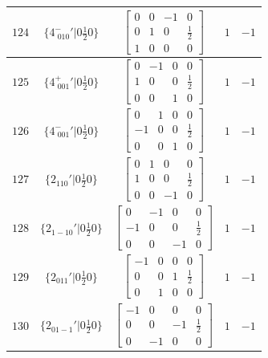 \documentclass[fleqn,8pt]{jsarticle}
\begin{document}
\begin{longtable}{ccccc}
$ 124 $ & $ \{4^{-}_{\,\,010}{}'|0 \frac{1}{2} 0\} $ & $ \begin{bmatrix} 0 & 0 & -1 & 0 \\ 0 & 1 & 0 & \frac{1}{2} \\ 1 & 0 & 0 & 0 \end{bmatrix} $ & $ 1 $ & $ -1 $ \\ \hline
$ 125 $ & $ \{4^{+}_{\,\,001}{}'|0 \frac{1}{2} 0\} $ & $ \begin{bmatrix} 0 & -1 & 0 & 0 \\ 1 & 0 & 0 & \frac{1}{2} \\ 0 & 0 & 1 & 0 \end{bmatrix} $ & $ 1 $ & $ -1 $ \\ \hline
$ 126 $ & $ \{4^{-}_{\,\,001}{}'|0 \frac{1}{2} 0\} $ & $ \begin{bmatrix} 0 & 1 & 0 & 0 \\ -1 & 0 & 0 & \frac{1}{2} \\ 0 & 0 & 1 & 0 \end{bmatrix} $ & $ 1 $ & $ -1 $ \\ \hline
$ 127 $ & $ \{2{}_{110}{}'|0 \frac{1}{2} 0\} $ & $ \begin{bmatrix} 0 & 1 & 0 & 0 \\ 1 & 0 & 0 & \frac{1}{2} \\ 0 & 0 & -1 & 0 \end{bmatrix} $ & $ 1 $ & $ -1 $ \\ \hline
$ 128 $ & $ \{2{}_{1-10}{}'|0 \frac{1}{2} 0\} $ & $ \begin{bmatrix} 0 & -1 & 0 & 0 \\ -1 & 0 & 0 & \frac{1}{2} \\ 0 & 0 & -1 & 0 \end{bmatrix} $ & $ 1 $ & $ -1 $ \\ \hline
$ 129 $ & $ \{2{}_{011}{}'|0 \frac{1}{2} 0\} $ & $ \begin{bmatrix} -1 & 0 & 0 & 0 \\ 0 & 0 & 1 & \frac{1}{2} \\ 0 & 1 & 0 & 0 \end{bmatrix} $ & $ 1 $ & $ -1 $ \\ \hline
$ 130 $ & $ \{2{}_{01-1}{}'|0 \frac{1}{2} 0\} $ & $ \begin{bmatrix} -1 & 0 & 0 & 0 \\ 0 & 0 & -1 & \frac{1}{2} \\ 0 & -1 & 0 & 0 \end{bmatrix} $ & $ 1 $ & $ -1 $ \\ \hline

\end{longtable}
\end{document}
